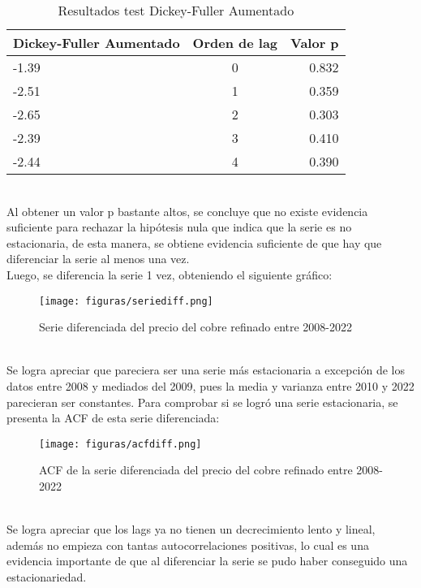 \documentclass{report}
\begin{document}
\begin{table}[h!]
  \begin{center}
    
    \label{tab:table1}
    \begin{tabular}{|l|c|r|} %
      \hline
      \textbf{Dickey-Fuller Aumentado} & \textbf{Orden de lag} & \textbf{Valor p} \\
      \hline
      -1.39 & 0 & 0.832\\
      \hline
      -2.51 & 1 & 0.359\\
      \hline
      -2.65 & 2 & 0.303\\
      \hline
      -2.39 & 3 & 0.410\\
      \hline
      -2.44 & 4 & 0.390\\
      \hline
    \end{tabular}
  \end{center}
  \caption{Resultados test Dickey-Fuller Aumentado }
\end{table}
\\
Al obtener un valor p bastante altos, se concluye que no existe evidencia suficiente para rechazar la hipótesis nula que indica que la serie es no estacionaria, de esta manera, se obtiene evidencia suficiente de que hay que diferenciar la serie al menos una vez.\\

Luego, se diferencia la serie 1 vez, obteniendo el siguiente gráfico:\\

\begin{figure}[htp]
        \centering
    	\texttt{[image: figuras/seriediff.png]}
    	\caption{Serie diferenciada del precio del cobre refinado entre 2008-2022}
    	\label{fig: Figura1}
    \end{figure}\\
Se logra apreciar que pareciera ser una serie más estacionaria a excepción de los datos entre 2008 y mediados del 2009, pues la media y varianza entre 2010 y 2022 parecieran ser constantes. Para comprobar si se logró una serie estacionaria, se presenta la ACF de esta serie diferenciada:\\
\vspace{3cm}

\begin{figure}[htp]
        \centering
    	\texttt{[image: figuras/acfdiff.png]}
    	\caption{ACF de la serie diferenciada del precio del cobre refinado entre 2008-2022}
    	\label{fig: Figura1}
\end{figure}\\
Se logra apreciar que los lags ya no tienen un decrecimiento lento y lineal, además no empieza con tantas autocorrelaciones positivas, lo cual es una evidencia importante de que al diferenciar la serie se pudo haber conseguido una estacionariedad. \\
\end{document}
